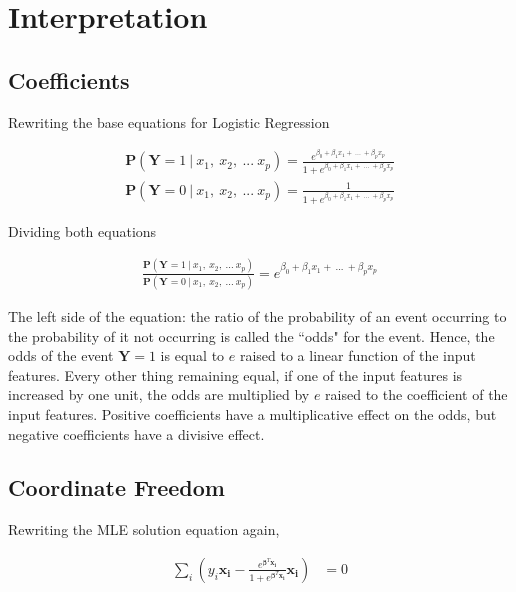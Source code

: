\documentclass[11pt, a4paper]{article}
\begin{document}
\section{Interpretation}

\subsection{Coefficients}

Rewriting the base equations for Logistic Regression

\begin{align*}
	\mathbf{P}(\mathbf{Y}=1\ |\ x_1,\ x_2,\ ...\ x_p) = \frac{e^{\beta_0 + \beta_1 x_1 +\  ...\  + \beta_p x_p}}{1 + e^{\beta_0 + \beta_1 x_1 +\  ...\  + \beta_p x_p}} \\
	\mathbf{P}(\mathbf{Y}=0\ |\ x_1,\ x_2,\ ...\ x_p) = \frac{1}{1 + e^{\beta_0 + \beta_1 x_1 +\  ...\  + \beta_p x_p}}                                                 
\end{align*}

Dividing both equations

\begin{align*}
	\frac{\mathbf{P}(\mathbf{Y}=1\ |\ x_1,\ x_2,\ ...\ x_p)}{\mathbf{P}(\mathbf{Y}=0\ |\ x_1,\ x_2,\ ...\ x_p) } = e^{\beta_0 + \beta_1 x_1 +\  ...\  + \beta_p x_p} 
\end{align*}

The left side of the equation: the ratio of the probability of an event occurring to the probability of it not occurring is called the ``odds" for the event. Hence, the odds of the event $\mathbf{Y}=1$  is equal to $e$ raised to a linear function of the input features. Every other thing remaining equal, if one of the input features is increased by one unit, the odds are multiplied by $e$ raised to the coefficient of the input features. Positive coefficients have a multiplicative effect on the odds, but negative coefficients have a divisive effect.

\subsection{Coordinate Freedom}

Rewriting the MLE solution equation again,

\begin{align*}
	\sum_i \left(y_i \boldsymbol{x_i} - \frac{e^{\boldsymbol{\beta}^T\boldsymbol{x_i}}}{1 + e^{\boldsymbol{\beta}^T\boldsymbol{x_i}}} \boldsymbol{x_i}\right) & = 0 \\
\end{align*}
\end{document}
